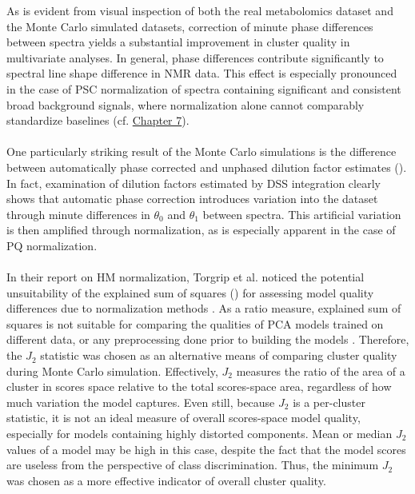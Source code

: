 \begin{doublespace}
As is evident from visual inspection of both the real metabolomics dataset and
the Monte Carlo simulated datasets, correction of minute phase differences
between spectra yields a substantial improvement in cluster quality in
multivariate analyses. In general, phase differences contribute significantly
to spectral line shape difference in \hnmr{} NMR data. This effect is
especially pronounced in the case of PSC normalization of spectra containing
significant and consistent broad background signals, where normalization
alone cannot comparably standardize baselines
(cf. \hyperlink{chapter.7}{Chapter 7}).
\\\\
One particularly striking result of the Monte Carlo simulations is the
difference between automatically phase corrected and unphased dilution factor
estimates (). In fact, examination of dilution factors
estimated by DSS integration clearly shows that automatic phase correction
introduces variation into the dataset through minute differences
in $\theta_0$ and $\theta_1$ between spectra. This artificial variation
is then amplified through normalization, as is especially apparent in the
case of PQ normalization.
\\\\
In their report on HM normalization, Torgrip et al. noticed the potential
unsuitability of the explained sum of squares (\rsqx{}) for assessing model
quality differences due to normalization methods \cite{torgrip:metab2008}.
As a ratio measure, explained sum of squares is not suitable for comparing
the qualities of PCA models trained on different data, or any preprocessing
done prior to building the models \cite{kjeldahl:jchemo2010}. Therefore, the
$J_2$ statistic was chosen as an alternative means of comparing cluster quality
during Monte Carlo simulation. Effectively, $J_2$ measures the ratio of the
area of a cluster in scores space relative to the total scores-space area,
regardless of how much variation the model captures. Even still, because $J_2$
is a per-cluster statistic, it is not an ideal measure of overall scores-space
model quality, especially for models containing highly distorted components.
Mean or median $J_2$ values of a model may be high in this case, despite the
fact that the model scores are useless from the perspective of class
discrimination. Thus, the minimum $J_2$ was chosen as a more effective
indicator of overall cluster quality.
\end{doublespace}

